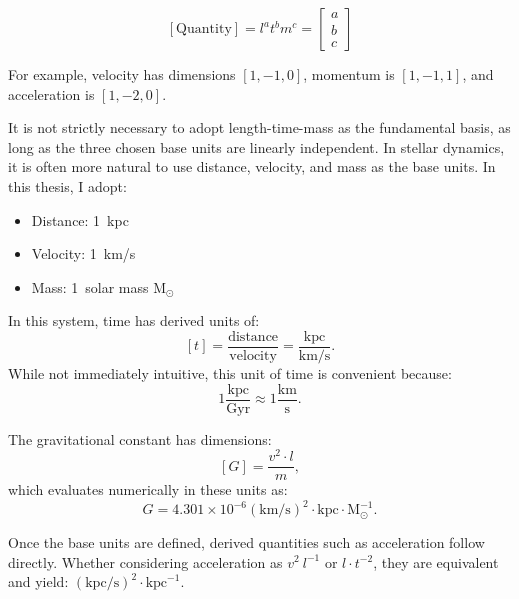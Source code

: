    \begin{equation}
        \left[\mathrm{Quantity}\right] = l^a t^b m^c =
            \begin{bmatrix}
                a\\
                b\\
                c 
            \end{bmatrix}
    \end{equation}

    For example, velocity has dimensions $[1, -1, 0]$, momentum is $[1, -1, 1]$, and acceleration is $[1, -2, 0]$.

    It is not strictly necessary to adopt length-time-mass as the fundamental basis, as long as the three chosen base units are linearly independent. In stellar dynamics, it is often more natural to use distance, velocity, and mass as the base units. In this thesis, I adopt:
    \begin{itemize}
        \item Distance: 1~kpc
        \item Velocity: 1~km/s 
        \item Mass: 1~solar mass $\mathrm{M}_\odot$
    \end{itemize}

    In this system, time has derived units of:
    \begin{equation}
        \left[t\right] = \frac{\mathrm{distance}}{\mathrm{velocity}} = \frac{\mathrm{kpc}}{\mathrm{km/s}}.
    \end{equation}
    While not immediately intuitive, this unit of time is convenient because:
    \begin{equation}
        1\frac{\mathrm{kpc}}{\mathrm{Gyr}} \approx 1\frac{\mathrm{km}}{\mathrm{s}}.
    \end{equation}

    The gravitational constant has dimensions:
    \begin{equation}    
        \left[G\right]=\frac{v^2 \cdot l}{m},
    \end{equation} 
    which evaluates numerically in these units as: 
    \begin{equation}
        G = 4.301 \times 10^{-6} \left(\mathrm{km}/\mathrm{s}\right)^2 \cdot \mathrm{kpc} \cdot \mathrm{M}_\odot^{-1}.
    \end{equation}

    Once the base units are defined, derived quantities such as acceleration follow directly. Whether considering acceleration as $v^2~l^{-1}$ or $l \cdot t^{-2}$, they are equivalent and yield: $\left(\mathrm{kpc}/\mathrm{s}\right)^2 \cdot \mathrm{kpc}^{-1}$.

